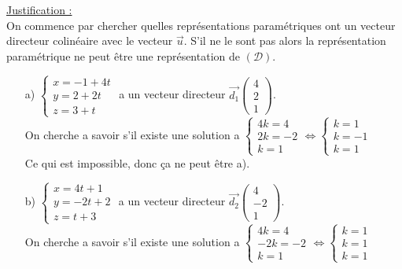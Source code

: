 \documentclass[a4paper, 12pt]{article}
\begin{document}
\noindent
\underline{Justification :}
\\
On commence par chercher quelles représentations paramétriques ont un vecteur directeur colinéaire avec le vecteur $\vec{u}$. S'il ne le sont pas alors la représentation paramétrique 
ne peut être une représentation de $(\mathcal{D})$. 
\vspace{3mm}
\begin{itemize}
    \item[a)] $\begin{cases} x = -1 + 4t \\ y = 2 + 2t \\ z = 3 + t \end{cases}$ a un vecteur directeur $\vec{d_1}\begin{pmatrix} 4 \\ 2 \\ 1 \end{pmatrix}$. 
    \\On cherche a savoir s'il existe une solution a $\begin{cases} 4k = 4 \\ 2k = -2 \\ k = 1 \end{cases} \iff \begin{cases} k = 1 \\ k = -1 \\k = 1 \end{cases}$ 
    \\Ce qui est impossible, donc ça ne peut être a). \vspace{5mm}
    \item[b)]  $\begin{cases} x = 4t + 1 \\ y = -2t + 2 \\ z = t + 3 \end{cases}$ a un vecteur directeur $\vec{d_2}\begin{pmatrix} 4 \\ -2 \\ 1 \end{pmatrix}$. 
    \\On cherche a savoir s'il existe une solution a $\begin{cases} 4k = 4 \\ -2k = -2 \\ k = 1 \end{cases} \iff \begin{cases} k = 1 \\ k = 1 \\k = 1 \end{cases}$ 

\end{itemize}
\end{document}
